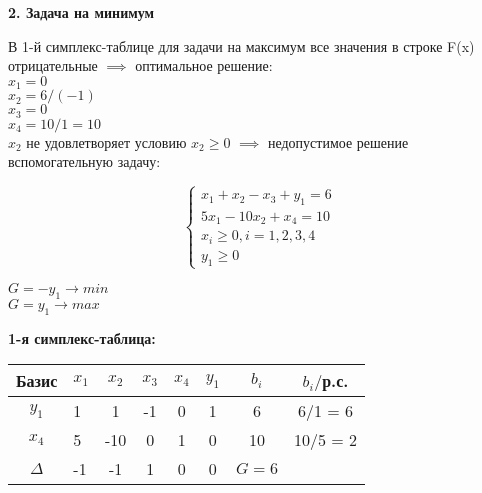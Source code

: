 \begin{flushleft}
    {\bf2. Задача на минимум}\\
\end{flushleft}

\begin{flushleft}
    В 1-й симплекс-таблице для задачи на максимум все значения в строке F(x) отрицательные $\implies$ оптимальное решение:\\
    $x_1 = 0$\\
    $x_2 = 6/(-1)$\\
    $x_3 = 0$\\
    $x_4 = 10/1 = 10$\\
    $x_2$ не удовлетворяет условию $x_2 \ge 0$ $\implies$ недопустимое решение\\
    { вспомогательную задачу:}\\
\end{flushleft}

\begin{equation*}
    \begin{cases}
        x_1 + x_2 - x_3 + y_1= 6 \\
        5x_1 - 10x_2 + x_4 = 10 \\
        x_i \ge 0, i = 1, 2, 3, 4\\
        y_1 \ge 0
    \end{cases}
\end{equation*}
\begin{center}
    $G = - y_1 \rightarrow min$\\
    $G = y_1 \rightarrow max$
\end{center}

\begin{flushleft}
    {\bf1-я симплекс-таблица:}
\end{flushleft}

\begin{center}
    \begin{tabular}{|c | g c c c c c c|} 
         \hline
            Базис & $x_1$ & $x_2$ & $x_3$ & $x_4$ & $y_1$ & $b_i$ & $b_i/$р.с.\\
         \hline
            $y_1$ & 1 & 1 & -1 & 0 & 1 & 6 & 6/1 = 6\\
         \hline
            $x_4$ & 5 & -10 & 0 & 1 & 0 & 10 & 10/5 = 2\\
         \hline
            $\Delta$ & -1 & -1 & 1 & 0 & 0 & $G = 6$ &\\
         \hline
    \end{tabular}
\end{center}

